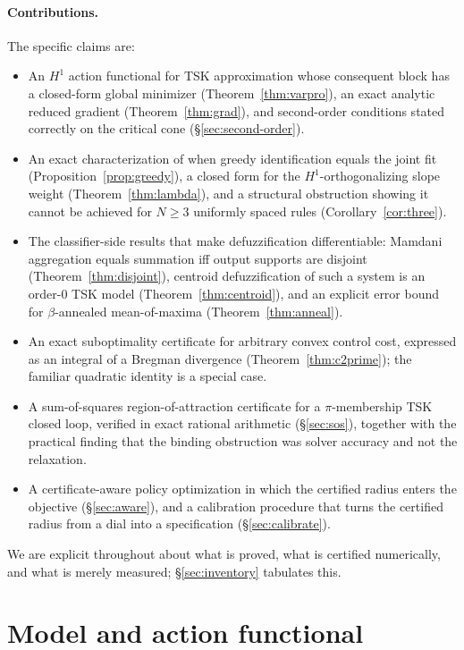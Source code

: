 \documentclass[11pt]{article}
\theoremstyle{plain}
\theoremstyle{definition}
\begin{document}
\paragraph{Contributions.} The specific claims are:
\begin{itemize}
\item An $H^1$ action functional for TSK approximation whose consequent block
has a closed-form global minimizer (Theorem~\ref{thm:varpro}), an exact
analytic reduced gradient (Theorem~\ref{thm:grad}), and second-order
conditions stated correctly on the critical cone (\S\ref{sec:second-order}).
\item An exact characterization of when greedy identification equals the joint
fit (Proposition~\ref{prop:greedy}), a closed form for the $H^1$-orthogonalizing
slope weight (Theorem~\ref{thm:lambda}), and a structural obstruction showing it
cannot be achieved for $N\ge3$ uniformly spaced rules
(Corollary~\ref{cor:three}).
\item The classifier-side results that make defuzzification differentiable:
Mamdani aggregation equals summation iff output supports are disjoint
(Theorem~\ref{thm:disjoint}), centroid defuzzification of such a system is an
order-$0$ TSK model (Theorem~\ref{thm:centroid}), and an explicit error bound
for $\beta$-annealed mean-of-maxima (Theorem~\ref{thm:anneal}).
\item An exact suboptimality certificate for arbitrary convex control cost,
expressed as an integral of a Bregman divergence (Theorem~\ref{thm:c2prime});
the familiar quadratic identity is a special case.
\item A sum-of-squares region-of-attraction certificate for a $\pi$-membership
TSK closed loop, verified in exact rational arithmetic
(\S\ref{sec:sos}), together with the practical finding that the binding
obstruction was solver accuracy and not the relaxation.
\item A certificate-aware policy optimization in which the certified radius
enters the objective (\S\ref{sec:aware}), and a calibration procedure that turns
the certified radius from a dial into a specification (\S\ref{sec:calibrate}).
\end{itemize}

We are explicit throughout about what is proved, what is certified numerically,
and what is merely measured; \S\ref{sec:inventory} tabulates this.

\section{Model and action functional}
\label{sec:model}
\end{document}
